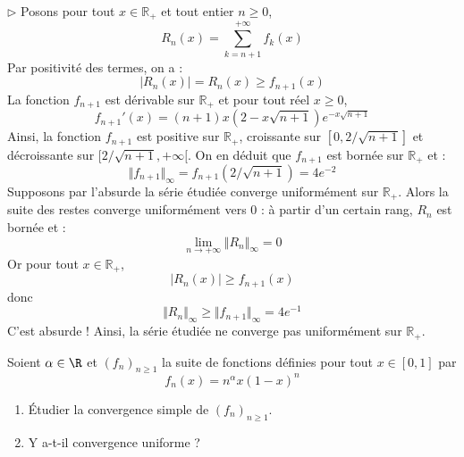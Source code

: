 \documentclass[a4paper,10pt]{report}
\begin{document}
\medskip

\noindent $\rhd$ Posons pour tout $x \in \mathbb{R}_+$ et tout entier $n \geq 0$,
$$ R_n(x) = \sum_{k=n+1}^{+ \infty} f_k(x)$$
Par positivité des termes, on a :
$$ \vert R_n(x) \vert = R_n(x) \geq f_{n+1}(x)$$
La fonction $f_{n+1}$ est dérivable sur $\mathbb{R}_+$ et pour tout réel $x \geq 0$,
$$ f_{n+1}'(x) = (n+1)x (2-x \sqrt{n+1})e^{-x \sqrt{n+1}}$$
Ainsi, la fonction $f_{n+1}$ est positive sur $\mathbb{R}_+$, croissante sur $[0, 2/ \sqrt{n+1}]$ et décroissante sur $[2/\sqrt{n+1}, + \infty[$. On en déduit que $f_{n+1}$ est bornée sur $\mathbb{R}_+$ et :
$$ \Vert f_{n+1} \Vert_{\infty} = f_{n+1}(2/\sqrt{n+1}) = 4 e^{-2}$$
Supposons par l'absurde la série étudiée converge uniformément sur $\mathbb{R}_+$. Alors la suite des restes converge uniformément vers $0$ : à partir d'un certain rang, $R_n$ est bornée et :
$$ \lim_{n \rightarrow + \infty} \Vert R_n \Vert_{ \infty} = 0$$
Or pour tout $x \in \mathbb{R}_+$,
$$  \vert R_n(x) \vert \geq f_{n+1}(x)$$
donc 
$$ \Vert R_n \Vert_{\infty} \geq \Vert f_{n+1} \Vert_{\infty} = 4 e^{-1}$$
C'est absurde ! Ainsi, la série étudiée ne converge pas uniformément sur $\mathbb{R}_+$.

\begin{Exa} Soient $\alpha \in \R$ et $(f_n)_{n \geq 1}$ la suite de fonctions définies pour tout $x \in [0,1]$ par 
$$f_n(x) = n^\alpha x(1-x)^n$$

\begin{enumerate}
 \item Étudier la convergence simple de $(f_n)_{n \geq 1}$.
 \item Y a-t-il convergence uniforme ?
  \end{enumerate}
\end{Exa}

\corr 
\end{document}
